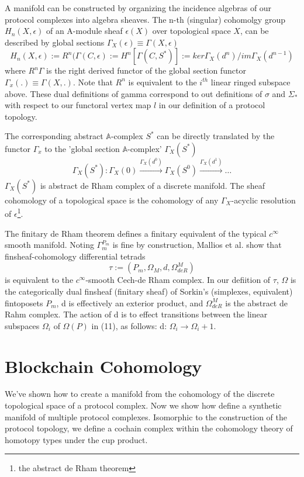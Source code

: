 \documentclass{article}
\begin{document}
A manifold can be constructed by organizing the incidence algebras of our protocol complexes into algebra sheaves. The n-th (singular) cohomolgy group $H_n(X, \epsilon)$ of an A-module sheaf $\epsilon(X)$ over topological space $X$, can be described by global sections $\Gamma_X(\epsilon) \equiv \Gamma (X, \epsilon)$
\begin{equation} \label{eq1}
H_n(X, \epsilon) := R^n(\Gamma(C,\epsilon) := H^n[\Gamma(C, S^*)] := ker\Gamma_X(d^n)/im\Gamma_X(d^{n-1})
\end{equation} \label{eq1}
where $R^n\Gamma$ is the right derived functor of the global section functor $\Gamma_x(.) \equiv \Gamma(X,.)$. Note that $R^n$ is equivalent to the $i^{th}$ linear ringed subspace above. These dual definitions of gamma correspond to out definitions of $\sigma$ and $\Sigma_*$ with respect to our functoral vertex map $l$ in our definition of a protocol topology.

The corresponding abstract $\mathbb{A}$-complex $S^*$ can be directly translated by the functor $\Gamma_x$ to the 'global section $\mathbb{A}$-complex' $\Gamma_X(S^*)$
\begin{equation} \label{eq1}
\Gamma_X(S^*): \Gamma_X(0) \xrightarrow{\Gamma_X(d^0)} \Gamma_X(S^0) \xrightarrow{\Gamma_X(d^1)}\dots
\end{equation} \label{eq1}
$\Gamma_X(S^*)$ is abstract de Rham complex of a discrete manifold. The sheaf cohomology of a topological space is the cohomology of any $\Gamma_X$-acyclic resolution of $\epsilon$\footnote{the abstract de Rham theorem}.

The finitary de Rham theorem defines a finitary equivalent of the typical $c^{\infty}$ smooth manifold. Noting $\Gamma^{P_m}_m$ is fine by construction, Mallios et al. show that finsheaf-cohomology differential tetrads
\begin{equation} \label{eq1}
\tau := (P_m, \Omega_M, d, \Omega^M_{deR})
\end{equation} \label{eq1}
is equivalent to the $c^{\infty}$-smooth Cech-de Rham complex. In our defiition of $\tau$, $\Omega$ is the categorically dual finsheaf (finitary sheaf) of Sorkin's (simplexes, equivalent) fintoposets $P_m$, d is effectively an exterior product, and $ \Omega^M_{deR}$ is the abstract de Rahm complex. The action of d is to effect transitions between the linear subspaces $\Omega_i$ of $\Omega(P)$ in (11), as follows: d: $\Omega_i \rightarrow \Omega_i+1$.

\section{Blockchain Cohomology}
We've shown how to create a manifold from the cohomology of the discrete topological space of a protocol complex. Now we show how define a synthetic manifold of multiple protocol complexes. Isomorphic to the construction of the protocol topology, we define a cochain complex within the cohomology theory of homotopy types under the cup product.
\end{document}

